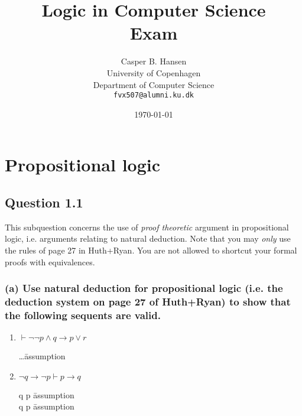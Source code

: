 \documentclass[10pt,a4paper]{article}
\title
{
	{\Large Logic in Computer Science}\\
	Exam
}
\author
{
	Casper B. Hansen\\
	University of Copenhagen\\
	Department of Computer Science\\
	{\tt fvx507@alumni.ku.dk}
}
\date{\today}
\let\imp\to
\begin{document}
\maketitle

\section{Propositional logic}
\subsection*{Question 1.1}
This subquestion concerns the use of {\it proof theoretic} argument in
propositional logic, i.e. arguments relating to natural deduction. Note that
you may {\it only} use the rules of page 27 in Huth+Ryan. You are not allowed
to shortcut your formal proofs with equivalences.
\subsubsection*{(a) \mdseries Use natural deduction for propositional logic
(i.e. the deduction system on page 27 of Huth+Ryan) to show that the following
sequents are valid.}

\begin{enumerate}[i]
	\item
	{
	$\vdash \neg\neg p \land q \imp p \lor r$
	\begin{proofbox}
		 \: \dots 								\=\mbox{assumption} \\
	\end{proofbox}
	}
	\item
	{
	$\neg q \imp \neg p \vdash p \imp q$
	\begin{proofbox}
		 \: \neg q \imp \neg p 					\=\mbox{assumption} \\
		 \: \neg q \imp \neg p 					\=\mbox{assumption} \\
	\end{proofbox}
	}
\end{enumerate}
\end{document}
